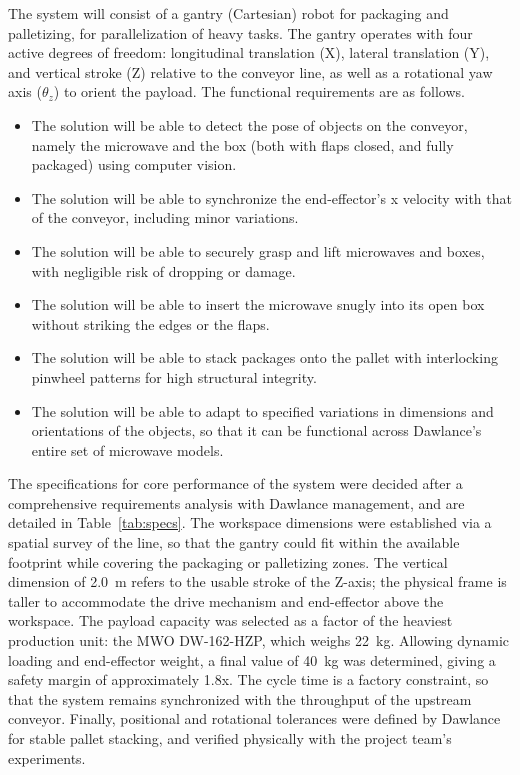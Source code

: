 The system will consist of a gantry (Cartesian) robot for packaging and palletizing, for parallelization of heavy tasks. The gantry operates with four active degrees of freedom: longitudinal translation (X), lateral translation (Y), and vertical stroke (Z) relative to the conveyor line, as well as a rotational yaw axis ($\theta_z$) to orient the payload. The functional requirements are as follows.

\begin{itemize}
    \item The solution will be able to detect the pose of objects on the conveyor, namely the microwave and the box (both with flaps closed, and fully packaged) using computer vision.
    \item The solution will be able to synchronize the end-effector's x velocity with that of the conveyor, including minor variations.
    \item The solution will be able to securely grasp and lift microwaves and boxes, with negligible risk of dropping or damage.
    \item The solution will be able to insert the microwave snugly into its open box without striking the edges or the flaps.
    \item The solution will be able to stack packages onto the pallet with interlocking pinwheel patterns for high structural integrity.
    \item The solution will be able to adapt to specified variations in dimensions and orientations of the objects, so that it can be functional across Dawlance's entire set of microwave models.
\end{itemize}

The specifications for core performance of the system were decided after a comprehensive requirements analysis with Dawlance management, and are detailed in Table~\ref{tab:specs}. The workspace dimensions were established via a spatial survey of the line, so that the gantry could fit within the available footprint while covering the packaging or palletizing zones. The vertical dimension of \qty{2.0}{m} refers to the usable stroke of the Z-axis; the physical frame is taller to accommodate the drive mechanism and end-effector above the workspace. The payload capacity was selected as a factor of the heaviest production unit: the MWO DW-162-HZP, which weighs \qty{22}{kg}. Allowing dynamic loading and end-effector weight, a final value of \qty{40}{kg} was determined, giving a safety margin of approximately 1.8x. The cycle time is a factory constraint, so that the system remains synchronized with the throughput of the upstream conveyor. Finally, positional and rotational tolerances were defined by Dawlance for stable pallet stacking, and verified physically with the project team's experiments.

